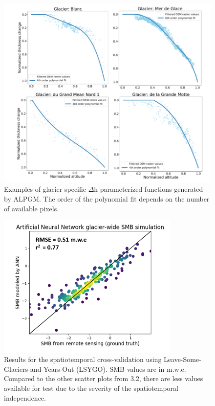 \begin{figure}[h]
\centering
\includegraphics[width=14cm]{Figures/methods/Figure_S3.png}
\caption{Examples of glacier specific $\Delta$h parameterized functions generated by ALPGM. The order of the polynomial fit depends on the number of available pixels.}
\end{figure}

\begin{figure}[h]
\centering
\includegraphics[width=9cm]{Figures/methods/Figure_S4.png}
\caption{Results for the spatiotemporal cross-validation using Leave-Some-Glaciers-and-Years-Out (LSYGO). SMB values are in m.w.e. Compared to the other scatter plots from 3.2, there are less values available for test due to the severity of the spatiotemporal independence.}
\label{methods:figS4}
\end{figure}

